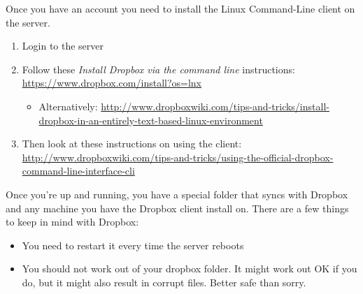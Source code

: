 \documentclass[nobib]{tufte-handout}
\begin{document}
Once you have an account you need to install the Linux Command-Line client on the server.
\begin{enumerate}
\item Login to the server
\item Follow these \textit{Install Dropbox via the command line} instructions: \url{https://www.dropbox.com/install?os=lnx}
\begin{itemize}
\item Alternatively: \url{http://www.dropboxwiki.com/tips-and-tricks/install-dropbox-in-an-entirely-text-based-linux-environment}
\end{itemize}
\item Then look at these instructions on using the client: \url{http://www.dropboxwiki.com/tips-and-tricks/using-the-official-dropbox-command-line-interface-cli}
\end{enumerate}

Once you're up and running, you have a special folder that syncs with Dropbox and any machine you have the Dropbox client install on. There are a few things to keep in mind with Dropbox:
\begin{itemize}
\item You need to restart it every time the server reboots
\item You should not work out of your dropbox folder. It might work out OK if you do, but it might also result in corrupt files. Better safe than sorry.
\end{itemize}
\end{document}
